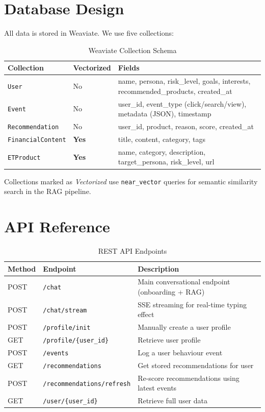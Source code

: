 \documentclass[12pt,a4paper]{article}
\begin{document}
\section{Database Design}

All data is stored in Weaviate. We use five collections:

\begin{table}[H]
\centering
\caption{Weaviate Collection Schema}
\begin{tabularx}{\textwidth}{llX}
\toprule
\textbf{Collection} & \textbf{Vectorized} & \textbf{Fields} \\
\midrule
\texttt{User} & No & name, persona, risk\_level, goals, interests, recommended\_products, created\_at \\
\texttt{Event} & No & user\_id, event\_type (click/search/view), metadata (JSON), timestamp \\
\texttt{Recommendation} & No & user\_id, product, reason, score, created\_at \\
\texttt{FinancialContent} & \textbf{Yes} & title, content, category, tags \\
\texttt{ETProduct} & \textbf{Yes} & name, category, description, target\_persona, risk\_level, url \\
\bottomrule
\end{tabularx}
\end{table}

Collections marked as \textit{Vectorized} use \texttt{near\_vector} queries for semantic similarity search in the RAG pipeline.

\section{API Reference}

\begin{table}[H]
\centering
\caption{REST API Endpoints}
\begin{tabularx}{\textwidth}{llX}
\toprule
\textbf{Method} & \textbf{Endpoint} & \textbf{Description} \\
\midrule
POST & \texttt{/chat} & Main conversational endpoint (onboarding + RAG) \\
POST & \texttt{/chat/stream} & SSE streaming for real-time typing effect \\
POST & \texttt{/profile/init} & Manually create a user profile \\
GET  & \texttt{/profile/\{user\_id\}} & Retrieve user profile \\
POST & \texttt{/events} & Log a user behaviour event \\
GET  & \texttt{/recommendations} & Get stored recommendations for user \\
POST & \texttt{/recommendations/refresh} & Re-score recommendations using latest events \\
GET  & \texttt{/user/\{user\_id\}} & Retrieve full user data \\
\bottomrule
\end{tabularx}
\end{table}
\end{document}
